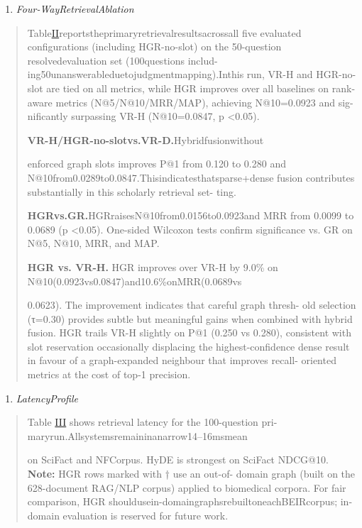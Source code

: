 \documentclass[
]{article}
\begin{document}
\begin{enumerate}
\def\labelenumi{\Alph{enumi}.}
\item
  \emph{Four-WayRetrievalAblation}
\end{enumerate}

\begin{quote}
Table\hyperref[_bookmark10]{II}reportstheprimaryretrievalresultsacrossall five evaluated configurations (including HGR-no-slot) on the 50-question resolvedevaluation set (100questions includ-ing50unanswerableduetojudgmentmapping).Inthis run, VR-H and HGR-no-slot are tied on all metrics, while HGR improves over all baselines on rank-aware metrics (N@5/N@10/MRR/MAP), achieving N@10=0.0923 and sig- nificantly surpassing VR-H (N@10=0.0847, p \textless0.05).

\textbf{VR-H/HGR-no-slotvs.VR-D.}Hybridfusionwithout

enforced graph slots improves P@1 from 0.120 to 0.280 and N@10from0.0289to0.0847.Thisindicatesthatsparse+dense fusion contributes substantially in this scholarly retrieval set- ting.

\textbf{HGRvs.GR.}HGRraisesN@10from0.0156to0.0923and MRR from 0.0099 to 0.0689 (p \textless0.05). One-sided Wilcoxon tests confirm significance vs. GR on N@5, N@10, MRR, and MAP.

\textbf{HGR vs. VR-H.} HGR improves over VR-H by 9.0\% on N@10(0.0923vs0.0847)and10.6\%onMRR(0.0689vs

0.0623). The improvement indicates that careful graph thresh- old selection (τ=0.30) provides subtle but meaningful gains when combined with hybrid fusion. HGR trails VR-H slightly on P@1 (0.250 vs 0.280), consistent with slot reservation occasionally displacing the highest-confidence dense result in favour of a graph-expanded neighbour that improves recall- oriented metrics at the cost of top-1 precision.
\end{quote}

\begin{enumerate}
\def\labelenumi{\Alph{enumi}.}
\setcounter{enumi}{1}
\item
  \emph{LatencyProfile}
\end{enumerate}

\begin{quote}
Table \hyperref[_bookmark11]{III} shows retrieval latency for the 100-question pri- maryrun.Allsystemsremaininanarrow14--16msmean

on SciFact and NFCorpus. HyDE is strongest on SciFact NDCG@10. \textbf{Note:} HGR rows marked with † use an out-of- domain graph (built on the 628-document RAG/NLP corpus) applied to biomedical corpora. For fair comparison, HGR shouldusein-domaingraphsrebuiltoneachBEIRcorpus; in-domain evaluation is reserved for future work.
\end{quote}
\end{document}
